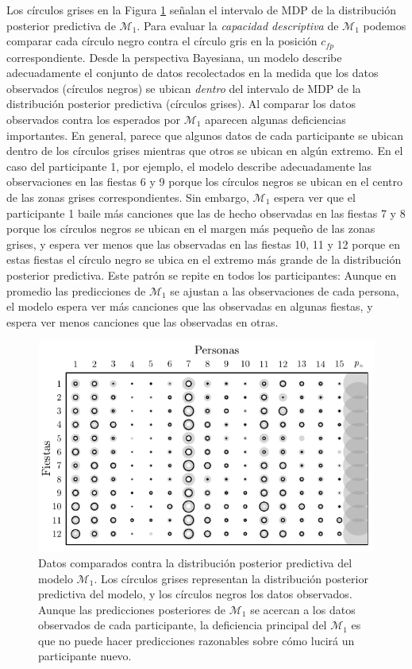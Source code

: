 \documentclass{article}
\begin{document}
\noindent Los círculos grises en la Figura \ref{fig:data_1} señalan el intervalo de MDP de la distribución posterior predictiva de $\mathcal M_1$. Para evaluar la \emph{capacidad descriptiva} de $\mathcal M_1$ podemos comparar cada círculo negro contra el círculo gris en la posición $c_{fp}$ correspondiente. Desde la perspectiva Bayesiana, un modelo describe adecuadamente el conjunto de datos recolectados en la medida que los datos observados (círculos negros) se ubican \emph{dentro} del intervalo de MDP de la distribución posterior predictiva (círculos grises). Al comparar los datos observados contra los esperados por $\mathcal M_1$ aparecen algunas deficiencias importantes. En general, parece que algunos datos de cada participante se ubican dentro de los círculos grises mientras que otros se ubican en algún extremo. En el caso del participante 1, por ejemplo, el modelo describe adecuadamente las observaciones en las fiestas 6 y 9 porque los círculos negros se ubican en el centro de las zonas grises correspondientes. Sin embargo, $\mathcal M_1$ espera ver que el participante  1 baile más canciones que las de hecho observadas en las fiestas 7 y 8 porque los círculos negros se ubican en el margen más pequeño de las zonas grises, y espera ver menos que las observadas en las fiestas 10, 11 y 12 porque en estas fiestas el círculo negro se ubica en el extremo más grande de la distribución posterior predictiva. Este patrón se repite en todos los participantes: Aunque en promedio las predicciones de $\mathcal M_1$ se ajustan a las observaciones de cada persona, el modelo espera ver más canciones que las observadas en algunas fiestas, y espera ver menos canciones que las observadas en otras.\\

\begin{figure}[H]
\centering
\setlength\fboxsep{0pt}
\setlength\fboxrule{0.5pt}
\includegraphics[trim=0cm 0cm 0cm 0cm, clip=true, width=1\textwidth]	{data_pos_pred_m1.pdf}
\caption{Datos comparados contra la distribución posterior predictiva del modelo $\mathcal M_1$. Los círculos grises representan la distribución posterior predictiva del modelo, y los círculos negros los datos observados. Aunque las predicciones posteriores de $\mathcal M_1$ se acercan a los datos observados de cada participante, la deficiencia principal del $\mathcal M_1$ es que no puede hacer predicciones razonables sobre cómo lucirá un participante nuevo.}
\label{fig:data_1}
\end{figure}
\end{document}
